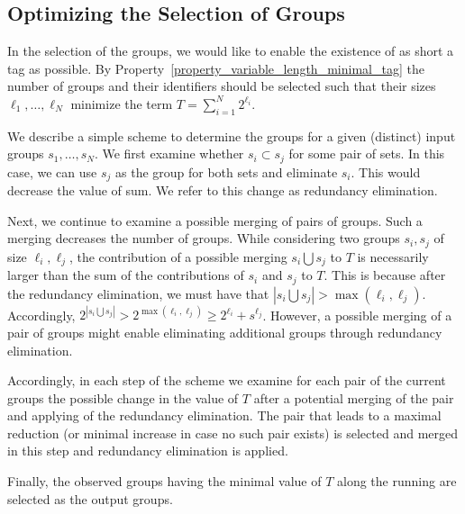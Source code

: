\subsection{Optimizing the Selection of Groups}
In the selection of the groups, we would like to enable the existence
of as short a tag as possible. By Property~\ref{property_variable_length_minimal_tag} the number of groups and their identifiers should be selected such that their sizes $\ell_1, \ldots, \ell_N$ minimize the term $T = \sum_{i = 1}^{N}{2^{\ell_i}}$. 

We describe a simple scheme to determine the groups for a given
(distinct) input groups $s_1, \ldots, s_N$. We first examine whether
$s_i \subset s_j$ for some pair of sets. In this case, we can use
$s_j$ as the group for both sets and eliminate $s_i$. This
would decrease the value of sum. We refer to this change as redundancy
elimination.

Next,  we continue to examine a possible merging of pairs of groups. Such a merging decreases the number of groups. While considering two groups $s_i, s_j$ of 
size $\ell_i, \ell_j$, the contribution of  a possible merging $s_i \bigcup s_j$ to $T$ is necessarily larger than  the sum of the contributions of $s_i$ and $s_j$ to $T$.
This is because after the redundancy elimination, we must have that $|s_i \bigcup s_j| > \max(\ell_i, \ell_j)$. Accordingly,  $2^{|s_i \bigcup s_j|} > 2^{\max(\ell_i, \ell_j)} \ge 
2^{\ell_i} + s^{\ell_j}$. However, a possible merging of a pair of groups might enable eliminating additional groups through redundancy elimination.

Accordingly, in each step of the scheme we examine for each pair of the current groups the possible change in the value of $T$ after a potential merging of the pair and applying of the redundancy elimination. The pair that leads to a maximal reduction (or minimal increase in case no such pair exists) is selected and merged in this step and  redundancy elimination is applied. 

Finally,  the observed groups having the minimal value of $T$ along the running are selected as the output groups.
 